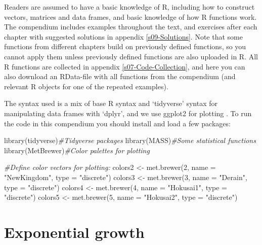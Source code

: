 \documentclass[
]{book}
\newenvironment{Shaded}{\begin{snugshade}}{\end{snugshade}}
\newcommand{\AttributeTok}[1]{\textcolor[rgb]{0.77,0.63,0.00}{#1}}
\newcommand{\CommentTok}[1]{\textcolor[rgb]{0.56,0.35,0.01}{\textit{#1}}}
\newcommand{\DecValTok}[1]{\textcolor[rgb]{0.00,0.00,0.81}{#1}}
\newcommand{\FunctionTok}[1]{\textcolor[rgb]{0.00,0.00,0.00}{#1}}
\newcommand{\NormalTok}[1]{#1}
\newcommand{\OtherTok}[1]{\textcolor[rgb]{0.56,0.35,0.01}{#1}}
\newcommand{\StringTok}[1]{\textcolor[rgb]{0.31,0.60,0.02}{#1}}
\begin{document}
Readers are assumed to have a basic knowledge of R, including how to construct vectors, matrices and data frames, and basic knowledge of how R functions work. The compendium includes examples throughout the text, and exercises after each chapter with suggested solutions in appendix \ref{s09-Solutions}. Note that some functions from different chapters build on previously defined functions, so you cannot apply them unless previously defined functions are also uploaded in R. All R functions are collected in appendix \ref{s07-Code-Collection}, and here you can also download an RData-file with all functions from the compendium (and relevant R objects for one of the repeated examples).

The syntax used is a mix of base R syntax and `tidyverse' syntax for manipulating data frames with `dplyr', and we use ggplot2 for plotting \citep{tidyverse}. To run the code in this compendium you should install and load a few packages:

\begin{Shaded}
\begin{Highlighting}[]
\FunctionTok{library}\NormalTok{(tidyverse)}\CommentTok{\#Tidyverse packages}
\FunctionTok{library}\NormalTok{(MASS)}\CommentTok{\#Some statistical functions}
\FunctionTok{library}\NormalTok{(MetBrewer)}\CommentTok{\#Color palettes for plotting}

\CommentTok{\#Define color vectors for plotting:}
\NormalTok{colors2 }\OtherTok{\textless{}{-}} \FunctionTok{met.brewer}\NormalTok{(}\DecValTok{2}\NormalTok{, }\AttributeTok{name =} \StringTok{"NewKingdom"}\NormalTok{, }\AttributeTok{type =} \StringTok{"discrete"}\NormalTok{)}
\NormalTok{colors3 }\OtherTok{\textless{}{-}} \FunctionTok{met.brewer}\NormalTok{(}\DecValTok{3}\NormalTok{, }\AttributeTok{name =} \StringTok{"Derain"}\NormalTok{, }\AttributeTok{type =} \StringTok{"discrete"}\NormalTok{)}
\NormalTok{colors4 }\OtherTok{\textless{}{-}} \FunctionTok{met.brewer}\NormalTok{(}\DecValTok{4}\NormalTok{, }\AttributeTok{name =} \StringTok{"Hokusai1"}\NormalTok{, }\AttributeTok{type =} \StringTok{"discrete"}\NormalTok{)}
\NormalTok{colors5 }\OtherTok{\textless{}{-}} \FunctionTok{met.brewer}\NormalTok{(}\DecValTok{5}\NormalTok{, }\AttributeTok{name =} \StringTok{"Hokusai2"}\NormalTok{, }\AttributeTok{type =} \StringTok{"discrete"}\NormalTok{)}
\end{Highlighting}
\end{Shaded}

\hypertarget{s01-Exponential}{%
\chapter{Exponential growth}\label{s01-Exponential}}
\end{document}
